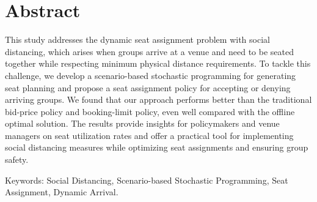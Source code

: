 
\section*{Abstract}

This study addresses the dynamic seat assignment problem with social distancing, which arises when groups arrive at a venue and need to be seated together while respecting minimum physical distance requirements. To tackle this challenge, we develop a scenario-based stochastic programming for generating seat planning and propose a seat assignment policy for accepting or denying arriving groups. We found that our approach performs better than the traditional bid-price policy and booking-limit policy, even well compared with the offline optimal solution. The results provide insights for policymakers and venue managers on seat utilization rates and offer a practical tool for implementing social distancing measures while optimizing seat assignments and ensuring group safety.


Keywords: Social Distancing, Scenario-based Stochastic Programming, Seat Assignment, Dynamic Arrival.


